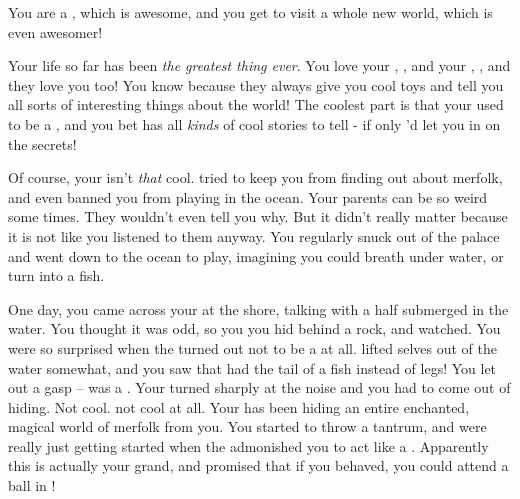 \documentclass[char]{NeptuneBall}
\begin{document}
\name{\cWillow{}}

You are a \cWillow{\prince}, which is awesome, and you get to visit a whole new world, which is even awesomer!

Your life so far has been \emph{the greatest thing ever}. You love your \cAriel{\pa}, \cAriel{}, and your \cEric{\pa}, \cEric{}, and they love you too! You know because they always give you cool toys and tell you all sorts of interesting things about the world! The coolest part is that your \cAriel{\pa} used to be a \emph{\cAriel{\mer}}, and you bet \cAriel{\they} has all \emph{kinds} of cool stories to tell - if only \cAriel{\they}'d let you in on the secrets!


Of course, your \cAriel{\pa} isn't \emph{that} cool. \cAriel{\They} tried to keep you from finding out about merfolk, and even banned you from playing in the ocean. Your parents can be so weird some times. They wouldn't even tell you why. But it didn't really matter because it is not like you listened to them anyway. You regularly snuck out of the palace and went down to the ocean to play, imagining you could breath under water, or turn into a fish.

One day, you came across your \cAriel{\pa} at the shore, talking with a \cKing{\human} half submerged in the water. You thought it was odd, so you you hid behind a rock, and watched. You were so surprised when the \cKing{\human} turned out not to be a \cKing{\human} at all. \cKing{\They} lifted \cKing{\them}selves out of the water somewhat, and you saw that \cKing{\they} had the tail of a fish instead of legs! You let out a gasp -- \cKing{\they} was a \cKing{\mer}. Your \cAriel{\pa} turned sharply at the noise and you had to come out of hiding. Not cool. not cool at all. Your \cAriel{\pa} has been hiding an entire enchanted, magical world of merfolk from you. You started to throw a tantrum, and were really just getting started when the \cKing{\mer} admonished you to act like a \cWillow{\prince}. Apparently this \cKing{\mer} is actually your grand\cKing{\parent}, and \cKing{\they} promised that if you behaved, you could attend a ball in \pAtlantis{}!
\end{document}
